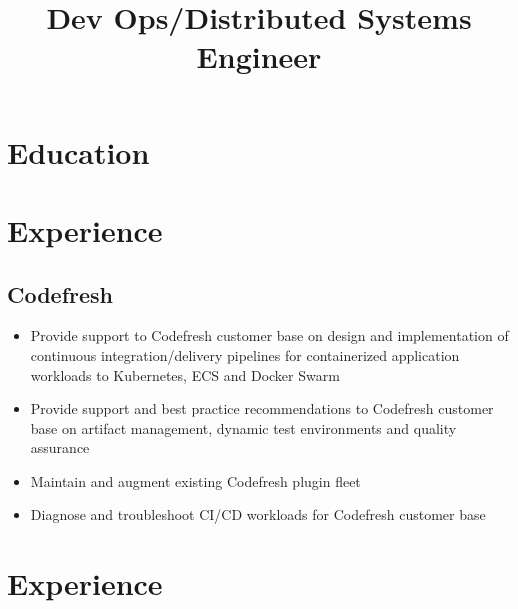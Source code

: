 \documentclass[11pt,a4paper,sans]{moderncv}   %
\title{Dev Ops/Distributed Systems Engineer}                          %
\begin{document}
\makecvtitle

\section{Education}

\section{Experience}
\subsection{Codefresh}
\begin{itemize}
  \item Provide support to Codefresh customer base on design and implementation of continuous integration/delivery pipelines for containerized application workloads to Kubernetes, ECS and Docker Swarm
  \item Provide support and best practice recommendations to Codefresh customer base on artifact management, dynamic test environments and quality assurance
  \item Maintain and augment existing Codefresh plugin fleet
  \item Diagnose and troubleshoot CI/CD workloads for Codefresh customer base
\end{itemize}
\section{Experience}
\end{document}

